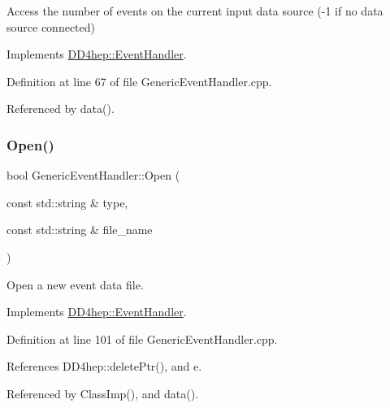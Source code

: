 Access the number of events on the current input data source (-\/1 if no data source connected) 



Implements \hyperlink{class_d_d4hep_1_1_event_handler_a005436bba029439b513645485e3c0ff5}{D\+D4hep\+::\+Event\+Handler}.



Definition at line 67 of file Generic\+Event\+Handler.\+cpp.



Referenced by data().

\hypertarget{class_d_d4hep_1_1_generic_event_handler_ab1a4e53010cf2aafdef02f8ceafc6ef0}{}\label{class_d_d4hep_1_1_generic_event_handler_ab1a4e53010cf2aafdef02f8ceafc6ef0} 
\subsubsection{\texorpdfstring{Open()}{Open()}}
{\footnotesize\ttfamily bool Generic\+Event\+Handler\+::\+Open (\begin{DoxyParamCaption}\item[{const std\+::string \&}]{type,  }\item[{const std\+::string \&}]{file\+\_\+name }\end{DoxyParamCaption})\hspace{0.3cm}{\ttfamily [virtual]}}



Open a new event data file. 



Implements \hyperlink{class_d_d4hep_1_1_event_handler_a90995d3b610beee9d9f7fafcc060626b}{D\+D4hep\+::\+Event\+Handler}.



Definition at line 101 of file Generic\+Event\+Handler.\+cpp.



References D\+D4hep\+::delete\+Ptr(), and e.



Referenced by Class\+Imp(), and data().

\hypertarget{class_d_d4hep_1_1_generic_event_handler_a4b833d9537c7c29b0bfb0d567f98d0a3}{}\label{class_d_d4hep_1_1_generic_event_handler_a4b833d9537c7c29b0bfb0d567f98d0a3} 
